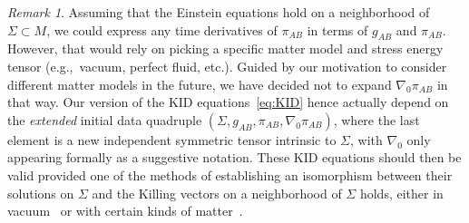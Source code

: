 \documentclass[a4paper]{article}
\theoremstyle{remark}
\newtheorem{rem}{Remark}
\begin{document}
\begin{rem}
Assuming that the Einstein equations hold on a neighborhood of $\Sigma
\subset M$, we could express any time derivatives of $\pi_{AB}$ in terms
of $g_{AB}$ and $\pi_{AB}$. However, that would rely on picking a
specific matter model and stress energy tensor (e.g.,\ vacuum, perfect
fluid, etc.). Guided by our motivation to consider different matter
models in the future, we have decided not to expand $\nabla_0 \pi_{AB}$
in that way. Our version of the KID equations~\eqref{eq:KID} hence
actually depend on the \emph{extended} initial data quadruple $(\Sigma,
g_{AB}, \pi_{AB}, \nabla_0\pi_{AB})$, where the last element is a new
independent symmetric tensor intrinsic to $\Sigma$, with $\nabla_0$ only
appearing formally as a suggestive notation. These KID equations should
then be valid provided one of the methods of establishing an isomorphism
between their solutions on $\Sigma$ and the Killing vectors on a
neighborhood of $\Sigma$ holds, either in vacuum~\cite{MONCRIEF-KID1,
COLL77, beig-chrusciel, khgp-ckid} or with certain kinds of
matter~\cite{racz-kid1, racz-kid2}.
\end{rem}
\end{document}
